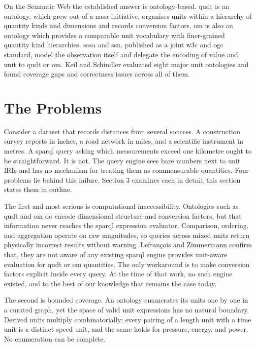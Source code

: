 On the Semantic Web the established answer is ontology-based. \ac{qudt} is an ontology, which grew out of a \ac{nasa} initiative, organises units within a hierarchy of quantity kinds and dimensions and records conversion factors. \ac{om} is also an ontology which provides a comparable unit vocabulary with finer-grained quantity kind hierarchies. \ac{sosa} and \ac{ssn}, published as a joint \ac{w3c} and \ac{ogc} standard, model the observation itself and delegate the encoding of value and unit to \ac{qudt} or \ac{om}. Keil and Schindler \cite{keil2018comparison} evaluated eight major unit ontologies and found coverage gaps and correctness issues across all of them. 

\section{The Problems}
Consider a dataset that records distances from several sources. A construction survey reports in inches, a road network in miles, and a scientific instrument in metres. A \ac{sparql} query asking which measurements exceed one kilometre ought to be straightforward. It is not. The query engine sees bare numbers next to unit IRIs and has no mechanism for treating them as commensurable quantities. Four problems lie behind this failure. Section 3 examines each in detail; this section states them in outline.

The first and most serious is computational inaccessibility. Ontologies such as \ac{qudt} and \ac{om} do encode dimensional structure and conversion factors, but that information never reaches the \ac{sparql} expression evaluator. Comparison, ordering, and aggregation operate on raw magnitudes, so queries across mixed units return physically incorrect results without warning. Lefrançois and Zimmermann \cite{lefranccois2018unified} confirm that, they are not aware of any existing \ac{sparql} engine provides unit-aware evaluation for \ac{qudt} or \ac{om} 
quantities. The only workaround is to make conversion factors explicit inside every query. 
At the time of that work, no such engine existed, and to the best of our knowledge 
that remains the case today.

The second is bounded coverage. An ontology enumerates its units one by one in a curated graph, yet the space of valid unit expressions has no natural boundary. Derived units multiply combinatorially: every pairing of a length unit with a time unit is a distinct speed unit, and the same holds for pressure, energy, and power. No enumeration can be complete.

